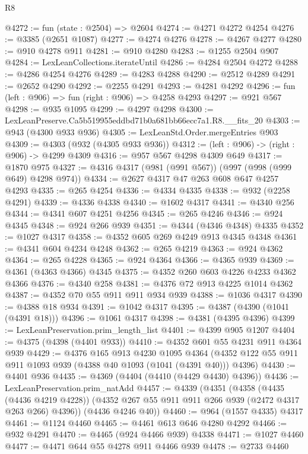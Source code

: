 \begin{lexlean}{R8}
\begin{coremodule}
@4272 := fun (state : @2504) => @2604
@4274 := @4271 @4272 @4254
@4276 := @3385 (@2651 @1087)
@4277 := @4274 @4276
@4278 := @4267 @4277
@4280 := @910 @4278 @911
@4281 := @910 @4280
@4283 := @1255 @2504 @907
@4284 := LexLeanCollections.iterateUntil
@4286 := @4284 @2504 @4272
@4288 := @4286 @4254 @4276
@4289 := @4283 @4288
@4290 := @2512 @4289
@4291 := @2652 @4290
@4292 := @2255 @4291
@4293 := @4281 @4292
@4296 := fun (left : @906) => fun (right : @906) => @4258 @4293
@4297 := @921 @567
@4298 := @935 @1095
@4299 := @4297 @4298
@4300 := LexLeanPreserve.Ca5b519955eddbd71b0a681bb66ecc7a1.R8.__fits_20
@4303 := @943 (@4300 @933 @936)
@4305 := LexLeanStd.Order.mergeEntries @903
@4309 := @4303 (@932 (@4305 @933 @936))
@4312 := (left : @906) -> (right : @906) -> @4299 @4309
@4316 := @957 @567 @4298 @4309 @649
@4317 := @1870 @975
@4327 := @4316 @4317 (@981 (@991 @567)) (@997 (@998 (@999 @649) @4298 @974))
@4334 := @2627 @4317 @47 @263 @608 @647 @4257 @4293
@4335 := @265 @4254
@4336 := @4334 @4335
@4338 := @932 (@2258 @4291)
@4339 := @4336 @4338
@4340 := @1602 @4317
@4341 := @4340 @256
@4344 := @4341 @607 @4251 @4256
@4345 := @265 @4246
@4346 := @924 @4345
@4348 := @924 @266 @939
@4351 := @4344 (@4346 @4348) @4335
@4352 := @1027 @4317
@4358 := @4352 @605 @269 @4249 @913 @4345 @4348
@4361 := @4341 @604 @4234 @4248
@4362 := @265 @4219
@4363 := @924 @4362
@4364 := @265 @4228
@4365 := @924 @4364
@4366 := @4365 @939
@4369 := @4361 (@4363 @4366) @4345
@4375 := @4352 @260 @603 @4226 @4233 @4362 @4366
@4376 := @4340 @258
@4381 := @4376 @72 @913 @4225 @1014 @4362
@4387 := @4352 @70 @55 @911 @911 @934 @939
@4388 := @1036 @4317
@4390 := @4388 @18 @934
@4391 := @1042 @4317
@4395 := @4387 (@4390 (@1041 (@4391 @18)))
@4396 := @1061 @4317
@4398 := @4381 (@4395 @4396)
@4399 := LexLeanPreservation.prim_length_list
@4401 := @4399 @905 @1207
@4404 := @4375 (@4398 (@4401 @933))
@4410 := @4352 @601 @55 @4231 @911 @4364 @939
@4429 := @4376
    @165
    @913
    @4230
    @1095
    @4364
    (@4352 @122 @55 @911 @911 @1093 @939 (@4388 @40 @1093 (@1041 (@4391 @40))) @4396)
@4430 := @4401 @936
@4435 := @4369 (@4404 (@4410 (@4429 @4430) @4396))
@4436 := LexLeanPreservation.prim_natAdd
@4457 := @4339
    (@4351
      (@4358
        (@4435 (@4436 @4219 @4228))
        (@4352 @267 @55 @911 @911 @266 @939 (@2472 @4317 @263 @266) @4396))
      (@4436 @4246 @40))
@4460 := @964 (@1557 @4335) @4317
@4461 := @1124 @4460
@4465 := @4461 @613 @646 @4280 @4292
@4466 := @932 @4291
@4470 := @4465 (@924 @4466 @939) @4338
@4471 := @1027 @4460
@4477 := @4471 @644 @55 @4278 @911 @4466 @939
@4478 := @2733 @4460

\end{coremodule}
\end{lexlean}
